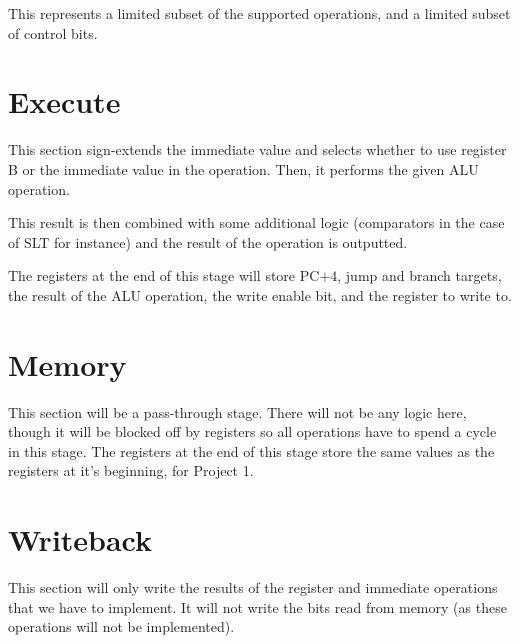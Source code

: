 \documentclass{article}
\begin{document}
This represents a limited subset of the supported operations, and a limited subset of control bits. 

\section*{Execute}
This section sign-extends the immediate value and selects whether to use register B or the immediate value in the operation.  Then, it performs the given ALU operation.

This result is then combined with some additional logic (comparators in the case of SLT for instance) and the result of the operation is outputted.

The registers at the end of this stage will store PC$+4$, jump and branch targets, the result of the ALU operation, the write enable bit, and the register to write to.

\section*{Memory}
This section will be a pass-through stage. There will not be any logic here, though it will be blocked off by registers so all operations have to spend a cycle in this stage. The registers at the end of this stage store the same values as the registers at it's beginning, for Project 1. 

\section*{Writeback}
This section will only write the results of the register and immediate operations that we have to implement.  It will not write the bits read from memory (as these operations will not be implemented).
\end{document}
